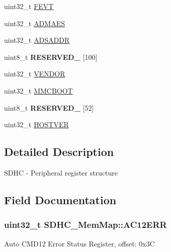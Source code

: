 \begin{DoxyCompactItemize}
\item 
uint32\+\_\+t \hyperlink{struct_s_d_h_c___mem_map_a6a098ed78e71b25e706ddcc64960aae7}{F\+E\+V\+T}
\item 
uint32\+\_\+t \hyperlink{struct_s_d_h_c___mem_map_a23a2344d2bcccb1d642214ffa2d011cc}{A\+D\+M\+A\+E\+S}
\item 
uint32\+\_\+t \hyperlink{struct_s_d_h_c___mem_map_add3530fe9767f7ef0f6401c049cd0d6f}{A\+D\+S\+A\+D\+D\+R}
\item 
\hypertarget{struct_s_d_h_c___mem_map_aa156aaa0eab63d8d7d2ac4d9dddeb0b2}{}uint8\+\_\+t {\bfseries R\+E\+S\+E\+R\+V\+E\+D\+\_} \mbox{[}100\mbox{]}\label{struct_s_d_h_c___mem_map_aa156aaa0eab63d8d7d2ac4d9dddeb0b2}

\item 
uint32\+\_\+t \hyperlink{struct_s_d_h_c___mem_map_ac3938ee338b7499c8b1cebed71604299}{V\+E\+N\+D\+O\+R}
\item 
uint32\+\_\+t \hyperlink{struct_s_d_h_c___mem_map_a624306ff04a5ff80059afce5d4e8cf3e}{M\+M\+C\+B\+O\+O\+T}
\item 
\hypertarget{struct_s_d_h_c___mem_map_ad593c098233cbb60497a364b88d113b8}{}uint8\+\_\+t {\bfseries R\+E\+S\+E\+R\+V\+E\+D\+\_} \mbox{[}52\mbox{]}\label{struct_s_d_h_c___mem_map_ad593c098233cbb60497a364b88d113b8}

\item 
uint32\+\_\+t \hyperlink{struct_s_d_h_c___mem_map_a27ec00dc3be305a561fae9978fe799a2}{H\+O\+S\+T\+V\+E\+R}
\end{DoxyCompactItemize}


\subsection{Detailed Description}
S\+D\+H\+C -\/ Peripheral register structure 

\subsection{Field Documentation}
\hypertarget{struct_s_d_h_c___mem_map_a3d4ff140cfa30e28f82a66490103dc18}{}
\subsubsection[{A\+C12\+E\+R\+R}]{\setlength{\rightskip}{0pt plus 5cm}uint32\+\_\+t S\+D\+H\+C\+\_\+\+Mem\+Map\+::\+A\+C12\+E\+R\+R}\label{struct_s_d_h_c___mem_map_a3d4ff140cfa30e28f82a66490103dc18}
Auto C\+M\+D12 Error Status Register, offset\+: 0x3\+C \hypertarget{struct_s_d_h_c___mem_map_a23a2344d2bcccb1d642214ffa2d011cc}{}

